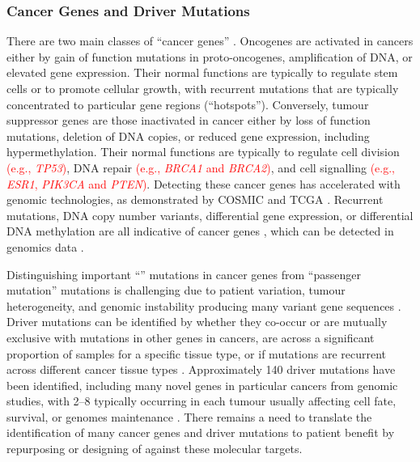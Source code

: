 \subsubsection{Cancer Genes and Driver Mutations}
There are two main classes of ``\glspl{cancer gene}'' \citep{Futreal2001}. Oncogenes are activated in cancers either by gain of function \glspl{mutation} in proto-oncogenes, amplification of \acrshort{DNA}, or elevated \gls{gene expression}. Their normal functions are typically to regulate stem cells or to promote cellular growth, with \glspl{recurrent mutation} that are typically concentrated to particular gene regions (``hotspots''). Conversely, \gls{tumour suppressor} genes are those inactivated in cancer either by loss of function \glspl{mutation}, deletion of \acrshort{DNA} copies, or reduced \gls{gene expression}, including hypermethylation. Their normal functions are typically to regulate cell division \textcolor{red}{(e.g., \textit{TP53})}, \acrshort{DNA} repair \textcolor{red}{(e.g., \textit{BRCA1} and \textit{BRCA2})}, and cell signalling \textcolor{red}{(e.g., \textit{ESR1}, \textit{PIK3CA} and \textit{PTEN})}.
%
Detecting these \glspl{cancer gene} has accelerated with \gls{genomic} technologies, as demonstrated by COSMIC and \gls{TCGA} \citep{COSMICdb, TCGA2013PAN}. Recurrent \glspl{mutation}, \acrshort{DNA} copy number variants, differential \gls{gene expression}, or differential \acrshort{DNA} methylation are all indicative of \glspl{cancer gene} \citep{Mattison2009}, which can be detected in \glspl{genomic} data \citep{METABRIC2016, TCGA2013PAN}. %

Distinguishing important ``'' \glspl{mutation} in \glspl{cancer gene} from ``\gls{passenger mutation}'' \glspl{mutation} is challenging due to patient variation, tumour heterogeneity, and genomic instability producing many variant gene sequences \citep{Stratton2009,  Tran2012}. Driver \glspl{mutation} can be identified by whether they co-occur or are mutually exclusive with \glspl{mutation} in other genes in cancers, are  across a significant proportion of samples for a specific tissue type, or if \glspl{mutation} are recurrent across different cancer tissue types \citep{ICGC2011, TCGA2013PAN, METABRIC2016, COSMICdb, cBioPortal}. Approximately 140 \glspl{driver mutation} have been identified, including many novel genes in particular cancers from \gls{genomic} studies, with 2--8 typically occurring in each tumour usually affecting cell fate, survival, or \glspl{genome} maintenance \citep{Vogelstein2013}. There remains a need to translate the identification of many \glspl{cancer gene} and \glspl{driver mutation} to patient benefit  %
by repurposing or designing of  against these molecular targets.  %

